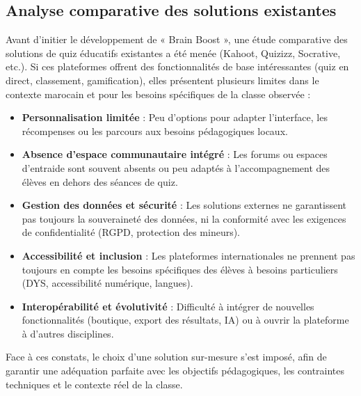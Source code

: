 \documentclass[a4paper,11pt]{report}
\begin{document}
\subsection{Analyse comparative des solutions existantes}
Avant d'initier le développement de « Brain Boost », une étude comparative des solutions de quiz éducatifs existantes a été menée (Kahoot, Quizizz, Socrative, etc.). Si ces plateformes offrent des fonctionnalités de base intéressantes (quiz en direct, classement, gamification), elles présentent plusieurs limites dans le contexte marocain et pour les besoins spécifiques de la classe observée :
\begin{itemize}
    \item \textbf{Personnalisation limitée} : Peu d'options pour adapter l'interface, les récompenses ou les parcours aux besoins pédagogiques locaux.
    \item \textbf{Absence d'espace communautaire intégré} : Les forums ou espaces d'entraide sont souvent absents ou peu adaptés à l'accompagnement des élèves en dehors des séances de quiz.
    \item \textbf{Gestion des données et sécurité} : Les solutions externes ne garantissent pas toujours la souveraineté des données, ni la conformité avec les exigences de confidentialité (RGPD, protection des mineurs).
    \item \textbf{Accessibilité et inclusion} : Les plateformes internationales ne prennent pas toujours en compte les besoins spécifiques des élèves à besoins particuliers (DYS, accessibilité numérique, langues).
    \item \textbf{Interopérabilité et évolutivité} : Difficulté à intégrer de nouvelles fonctionnalités (boutique, export des résultats, IA) ou à ouvrir la plateforme à d'autres disciplines.
\end{itemize}
Face à ces constats, le choix d'une solution sur-mesure s'est imposé, afin de garantir une adéquation parfaite avec les objectifs pédagogiques, les contraintes techniques et le contexte réel de la classe.
\end{document}
